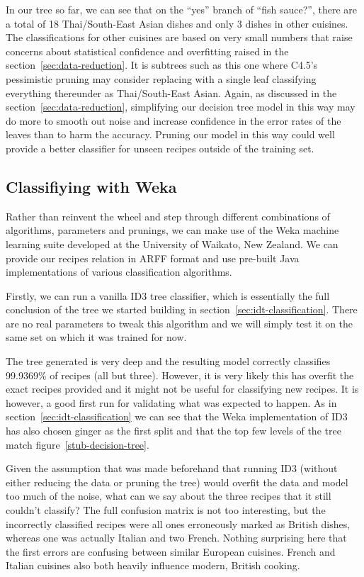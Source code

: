 \documentclass[11pt,a4paper]{article}
\begin{document}
In our tree so far, we can see that on the ``yes'' branch of ``fish sauce?'',
there are a total of 18 Thai/South-East Asian dishes and only 3 dishes
in other cuisines. The classifications for other cuisines are based on
very small numbers that raise concerns about statistical confidence and
overfitting raised in the section~\ref{sec:data-reduction}. It is subtrees such as
this one where C4.5's pessimistic pruning may consider replacing
with a single leaf classifying everything thereunder as Thai/South-East Asian.
Again, as discussed in the section~\ref{sec:data-reduction}, simplifying our decision tree
model in this way may do more to smooth out noise and increase confidence in the
error rates of the leaves than to harm the accuracy. Pruning our
model in this way could well provide a better classifier for unseen recipes outside
of the training set.

\subsection{Classifiying with Weka}
\label{sec:weka}

Rather than reinvent the wheel and step through different combinations
of algorithms, parameters and prunings, we can make use of the Weka \cite{witten2011data}
machine learning suite developed at the University of Waikato, New Zealand.
We can provide our recipes relation in ARFF format and use pre-built Java
implementations of various classification algorithms.

Firstly, we can run a vanilla ID3 tree classifier, which is essentially the full
conclusion of the tree we started building in section~\ref{sec:idt-classification}.
There are no real parameters to tweak this algorithm and we will simply test it on the
same set on which it was trained for now.

The tree generated is very deep and the resulting model correctly classifies 99.9369\%
of recipes (all but three). However, it is very likely this has overfit the exact
recipes provided and it might not be useful for classifying new recipes. It is
however, a good first run for validating what was expected to happen. As in
section~\ref{sec:idt-classification} we can see that the Weka implementation of ID3
has also chosen ginger as the first split and that the top few levels
of the tree match figure~\ref{stub-decision-tree}.

Given the assumption that was made beforehand that running ID3
(without either reducing the data or pruning the tree) would overfit the
data and model too much of the noise, what can we say about the three recipes that it
still couldn't classify? The full confusion matrix is not too interesting, but
the incorrectly classified recipes were all ones erroneously marked as British
dishes, whereas one was actually Italian and two French. Nothing surprising here
that the first errors are confusing between similar European cuisines. French and
Italian cuisines also both heavily influence modern, British cooking.
\end{document}
